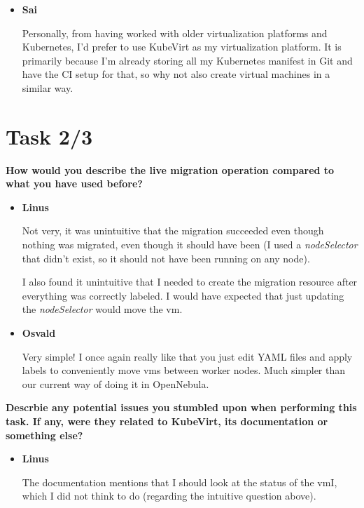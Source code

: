 \documentclass{kththesis}
\begin{document}
\begin{enumerate}
\begin{itemize}
Everything was smooth sailing (except when I didn't read the instructions properly and missed the provided password). This process for managing \Glspl{vm} is much more direct, transparent and reproducible than using a UI-based tool.

\item \textbf{Sai}

Personally, from having worked with older virtualization platforms and Kubernetes, I'd prefer to use KubeVirt as my virtualization platform.
It is primarily because I'm already storing all my Kubernetes manifest in Git and have the CI setup for that, so why not also create virtual machines in a similar way.

\end{itemize}

\section{Task 2/3}
\noindent \textbf{How would you describe the live migration operation compared to what you have used before?}
\begin{itemize}
\item \textbf{Linus}

Not very, it was unintuitive that the migration succeeded even though nothing was migrated, even though it should have been (I used a \textit{nodeSelector} that didn't exist, so it should not have been running on any node).

I also found it unintuitive that I needed to create the migration resource after everything was correctly labeled. I would have expected that just updating the \textit{nodeSelector} would move the \Gls{vm}.

\item \textbf{Osvald}

Very simple! I once again really like that you just edit YAML files and apply labels to conveniently move \Glspl{vm} between worker nodes. Much simpler than our current way of doing it in OpenNebula.

\end{itemize}

\noindent \textbf{Descrbie any potential issues you stumbled upon when performing this task. If any, were they related to KubeVirt, its documentation or something else?}
\begin{itemize}
\item \textbf{Linus}

The documentation mentions that I should look at the status of the \Gls{vm}I, which I did not think to do (regarding the intuitive question above).


\end{itemize}
\end{enumerate}
\end{document}
